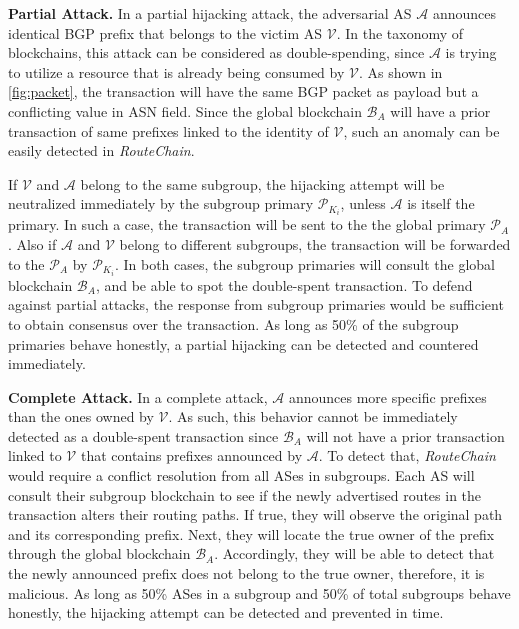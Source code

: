 \documentclass[5p]{elsarticle}
\newcommand{\BfPara}[1]{{\noindent\bf#1.}\xspace}
\newcommand{\rc}{{{\em RouteChain}}\xspace}
\begin{document}
\BfPara{Partial Attack} In a partial hijacking attack, the adversarial AS $\mathcal{A}$ announces identical BGP prefix that belongs to the victim AS $\mathcal{V}$. In the taxonomy of blockchains, this attack can be considered as double-spending, since $\mathcal{A}$ is trying to utilize a resource that is already being consumed by $\mathcal{V}$. As shown in \autoref{fig:packet}, the transaction will have the same BGP packet as payload but a conflicting value in ASN field. Since the global blockchain $\mathcal{B}_{A}$ will have a prior transaction of same prefixes linked to the identity of $\mathcal{V}$, such an anomaly can be easily detected in \rc. 

If $\mathcal{V}$ and $\mathcal{A}$ belong to the same subgroup, the hijacking attempt will be neutralized immediately by the subgroup primary $\mathcal{P}_{K_{i}}$, unless $\mathcal{A}$ is itself the primary. In such a case, the transaction will be sent to the the global primary $\mathcal{P}_{A}$. Also if $\mathcal{A}$ and $\mathcal{V}$ belong to different subgroups, the transaction will be forwarded to the $\mathcal{P}_{A}$ by $\mathcal{P}_{K_{i}}$. In both cases, the subgroup primaries will consult the global blockchain $\mathcal{B}_{A}$, and be able to spot the double-spent transaction. To defend against partial attacks, the response from subgroup primaries would be sufficient to obtain consensus over the transaction. As long as 50\% of the subgroup primaries behave honestly, a partial hijacking can be detected and countered immediately.  

\BfPara{Complete Attack} In a complete attack, $\mathcal{A}$ announces more specific prefixes than the ones owned by $\mathcal{V}$. As such, this behavior cannot be immediately detected as a double-spent transaction since $\mathcal{B}_{A}$ will not have a prior transaction linked to $\mathcal{V}$ that contains prefixes announced by $\mathcal{A}$. To detect that, \rc would require a conflict resolution from all ASes in subgroups. Each AS will consult their subgroup blockchain to see if the newly advertised routes in the transaction alters their routing paths. If true, they will observe the original path and its corresponding prefix. Next, they will locate the true owner of the prefix through the global blockchain $\mathcal{B}_{A}$. Accordingly, they will be able to detect that the newly announced prefix does not belong to the true owner, therefore, it is malicious. As long as 50\% ASes in a subgroup and 50\% of total subgroups behave honestly, the hijacking attempt can be detected and prevented in time. 
\end{document}
